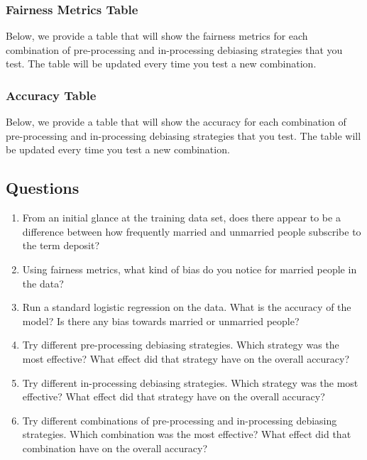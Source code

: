 \begin{VCSet}
\subsubsection{Fairness Metrics Table}
\par Below, we provide a table that will show the fairness metrics for each combination of pre-processing and in-processing debiasing strategies that you test. The table will be updated every time you test a new combination.
\begin{visualComponent}
\end{visualComponent}

\subsubsection{Accuracy Table}
\par Below, we provide a table that will show the accuracy for each combination of pre-processing and in-processing debiasing strategies that you test. The table will be updated every time you test a new combination.
\begin{visualComponent}
\end{visualComponent}

\end{VCSet}

\subsection{Questions}

\begin{enumerate}
\item From an initial glance at the training data set, does there appear to be a difference between how frequently married and unmarried people subscribe to the term deposit?

\item Using fairness metrics, what kind of bias do you notice for married people in the data?

\item Run a standard logistic regression on the data. What is the accuracy of the model? Is there any bias towards married or unmarried people?

\item Try different pre-processing debiasing strategies. Which strategy was the most effective? What effect did that strategy have on the overall accuracy?

\item Try different in-processing debiasing strategies. Which strategy was the most effective? What effect did that strategy have on the overall accuracy?

\item Try different combinations of pre-processing and in-processing debiasing strategies. Which combination was the most effective? What effect did that combination have on the overall accuracy?
    
\end{enumerate}
